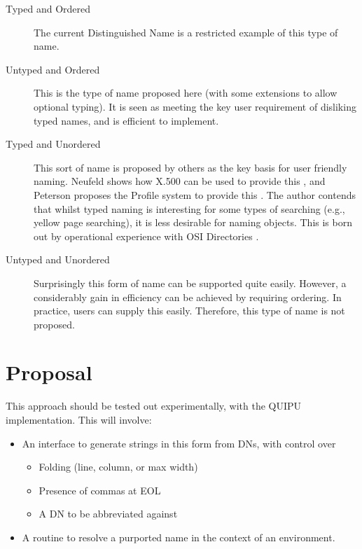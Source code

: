 \begin{description}
\item[Typed and Ordered] The current Distinguished Name is a restricted
example of this type of name.

\item[Untyped and Ordered] This is the type of name proposed here (with some
extensions to allow optional typing).  It is seen as meeting the key user
requirement of disliking typed names, and is efficient to implement.

\item[Typed and Unordered] This sort of name is proposed by others as the
key basis for user friendly naming.  Neufeld shows how X.500 can be used to
provide this \cite{Neufeld.Descr}, and Peterson proposes the Profile system
to provide this \cite{Profile.2}.  The author contends that whilst typed
naming is interesting for some types of searching (e.g., yellow page
searching), it is less desirable for
naming objects.  This is born out by operational experience with OSI
Directories \cite{THORN.RARE.LSPX}.

\item[Untyped and Unordered] Surprisingly this form of name can be supported
quite easily.  However, a considerably gain in efficiency can be achieved by
requiring ordering.  In practice, users can supply this easily.  Therefore,
this type of name is not proposed.   
\end{description}


\section {Proposal}

This approach should be tested out experimentally, with the QUIPU
implementation.  This will involve:

\begin{itemize}
\item An interface to generate strings in this form from DNs, with control over
\begin{itemize}
\item Folding (line, column, or max width)
\item Presence of commas at EOL
\item A DN to be abbreviated against
\end{itemize}

\item A routine to resolve a purported name in the context of an environment.
\end{itemize}

